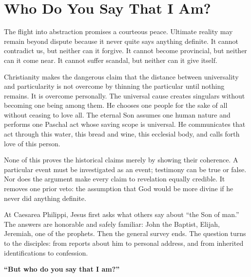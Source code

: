 \section{Who Do You Say That I Am?}

The flight into abstraction promises a courteous peace. Ultimate reality may remain beyond dispute because it never quite says anything definite. It cannot contradict us, but neither can it forgive. It cannot become provincial, but neither can it come near. It cannot suffer scandal, but neither can it give itself.

Christianity makes the dangerous claim that the distance between universality and particularity is not overcome by thinning the particular until nothing remains. It is overcome personally. The universal cause creates singulars without becoming one being among them. He chooses one people for the sake of all without ceasing to love all. The eternal Son assumes one human nature and performs one Paschal act whose saving scope is universal. He communicates that act through this water, this bread and wine, this ecclesial body, and calls forth love of this person.

None of this proves the historical claims merely by showing their coherence. A particular event must be investigated as an event; testimony can be true or false. Nor does the argument make every claim to revelation equally credible. It removes one prior veto: the assumption that God would be more divine if he never did anything definite.

At Caesarea Philippi, Jesus first asks what others say about ``the Son of man.'' The answers are honorable and safely familiar: John the Baptist, Elijah, Jeremiah, one of the prophets. Then the general survey ends. The question turns to the disciples: from reports about him to personal address, and from inherited identifications to confession.

\vspace{1.0\baselineskip}
\begin{center}
{\Large\bfseries ``But who do you say that I am?''}
\end{center}
